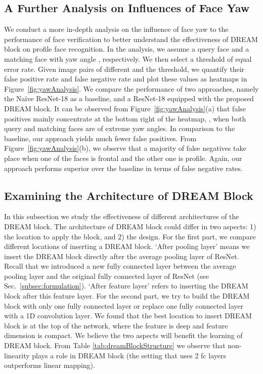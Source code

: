 \documentclass[10pt,twocolumn,letterpaper]{article}
\begin{document}
\subsection{A Further Analysis on Influences of Face Yaw}


We conduct a more in-depth analysis on the influence of face yaw to the performance of face verification to better understand the effectiveness of DREAM block on profile face recognition. 
In the analysis, we assume a query face and a matching face with yaw angle , respectively. We then select a threshold of equal error rate. Given image pairs of different  and the threshold, we quantify their false positive rate and false negative rate and plot these values as heatmaps in Figure~\ref{fig:yawAnalysis}. We compare the performance of two approaches, namely the Na\"{i}ve ResNet-18 as a baseline, and a ResNet-18 equipped with the proposed DREAM block. 
It can be observed from Figure~\ref{fig:yawAnalysis}(a) that false positives mainly concentrate at the bottom right of the heatmap, \ie, when both query and matching faces are of extreme yaw angles. In comparison to the baseline, our approach yields much fewer false positives. 
From Figure~\ref{fig:yawAnalysis}(b), we observe that a majority of false negatives take place when one of the faces is frontal and the other one is profile. Again, our approach performs superior over the baseline in terms of false negative rates.

\subsection{Examining the Architecture of DREAM Block}


In this subsection we study the effectiveness of different architectures of the DREAM block. The architecture of DREAM block could differ in two aspects: 1) the location to apply the block, and 2) the design. For the first part, we compare different locations of inserting a DREAM block.
`After pooling layer' means we insert the DREAM block directly after the average pooling layer of ResNet. 
Recall that we introduced a new fully connected layer between the average pooling layer and the original fully connected layer of ResNet (see Sec.~\ref{subsec:formulation}). `After feature layer' refers to inserting the DREAM block after this feature layer.
For the second part, we try to build the DREAM block with only one fully connected layer or replace one fully connected layer with a 1D convolution layer. 
We found that the best location to insert DREAM block is at the top of the network, where the feature is deep and feature dimension is compact. We believe the two aspects will benefit the learning of DREAM block. From Table \ref{tab:dreamBlockStructure} we observe that non-linearity plays a role in DREAM block (the setting that uses 2 fc layers outperforms linear mapping).
\end{document}

